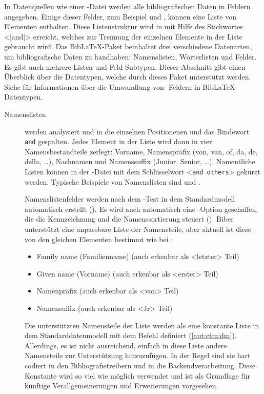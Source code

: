 \documentclass{ltxdockit}[2011/03/25]
\newcommand*{\biber}{Biber\xspace}
\newcommand*{\biblatex}{BibLaTeX\xspace}
\begin{document}
In Datenquellen wie einer -Datei werden alle bibliografischen Daten in
Feldern angegeben.
Einige dieser Felder, zum Beispiel  und ,
können eine Liste von Elementen enthalten. Diese Listenstruktur wird in \bibtex
mit Hilfe des Stichwortes <|and|> erreicht, welches zur Trennung der einzelnen
Elemente in der Liste gebraucht wird. Das \biblatex-Paket beinhaltet drei
verschiedene Datenarten, um bibliografische Daten zu handhaben: Namenslisten,
Wörterlisten und Felder. Es gibt auch mehrere Listen und Feld-Subtypen. Dieser
Abschnitt gibt einen Überblick über die Datentypen, welche durch dieses Paket
unterstützt werden. Siehe  für Informationen
über die Umwandlung von \bibtex-Feldern in \biblatex-Datentypen. 

\begin{description}

\item[Namenslisten] werden analysiert und in die einzelnen Positionenen und das
Bindewort \texttt{and} gespalten. Jedes Element in der Liste wird dann in vier
Namensbestandteile zerlegt: Vorname, Namenspräfix (von, van, of, da, de, della,
\dots), Nachnamen und Namenssuffix (Junior, Senior, \dots). Namentliche Listen
können in der -Datei mit dem Schlüsselwort <\texttt{and others}>
gekürzt werden. Typische Beispiele von Namenslisten sind  und
.

Namenslistenfelder werden nach dem  -Test 
in dem Standardmodell automatisch erstellt (). Es wird auch 
automatisch eine -Option geschaffen, die die Kennzeichnung und die Namenssortierung steuert (). \biber unterstützt
eine anpassbare Liste der Namensteile, aber aktuell ist diese von den gleichen Elementen bestimmt wie bei \bibtex:

\begin{itemize}
\item Family name (Familienname) (auch erkenbar als <letzter> Teil)
\item Given name (Vorname) (auch erkenbar als <erster> Teil)
\item Namenpräfix (auch erkenbar als <von> Teil)
\item Namensuffix (auch erkenbar als <Jr> Teil)
\end{itemize}

Die unterstützten Namensteile der Liste werden als eine konstante Liste in dem 
Standarddatenmodell mit dem Befehl  definiert
(\ref{aut:ctm:dm}). Allerdings, es ist nicht ausreichend, einfach in diese Liste andere Namensteile zur Unterstützung hinzuzufügen. In der Regel sind sie hart codiert in den Bibliografietreibern und in die Backendverarbeitung. Diese Konstante
wird so viel wie möglich verwendet und ist als Grundlage für künftige 
Verallgemeinerungen und Erweiterungen vorgesehen.


\end{description}
\end{document}

